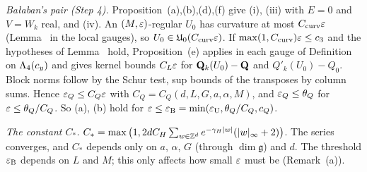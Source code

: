 \begin{detail}
\begin{step}
\end{step}
\begin{step}
\emph{Ba\l aban's pair (Step 4).} Proposition~(a),(b),(d),(f) give (i), (iii) with $E=0$ and $V=W_k$ real, and (iv). An $(M,\varepsilon)$-regular $U_0$ has curvature at most $C_{\rm curv}\varepsilon$ (Lemma~ in the local gauges), so $U_0\in\mathfrak U_0(C_{\rm curv}\varepsilon)$. If $\max(1,C_{\rm curv})\varepsilon\le c_3$ and the hypotheses of Lemma~ hold, Proposition~(e) applies in each gauge of Definition~ on $\Lambda_4(c_y)$ and gives kernel bounds $C_L\varepsilon$ for $\mathbf Q_k(U_0)-\mathbf Q$ and $Q'_k(U_0)-Q_0$. Block norms follow by the Schur test, sup bounds of the transposes by column sums. Hence $\varepsilon_Q\le C_Q\varepsilon$ with $C_Q=C_Q(d,L,G,a,\alpha,M)$, and $\varepsilon_Q\le\theta_Q$ for $\varepsilon\le\theta_Q/C_Q$. So (a), (b) hold for $\varepsilon\le\varepsilon_{\rm B}=\min(\varepsilon_{\rm U},\theta_Q/C_Q,c_Q)$.
\end{step}
\begin{step}
\emph{The constant $C_*$.} $C_*=\max\big(1,2dC_H\sum_{w\in\mathbb Z^d}e^{-\gamma_H|w|}(|w|_\infty+2)\big)$. The series converges, and $C_*$ depends only on $a$, $\alpha$, $G$ (through $\dim\mathfrak g$) and $d$. The threshold $\varepsilon_{\rm B}$ depends on $L$ and $M$; this only affects how small $\varepsilon$ must be (Remark~(a)).
\end{step}
\end{detail}

